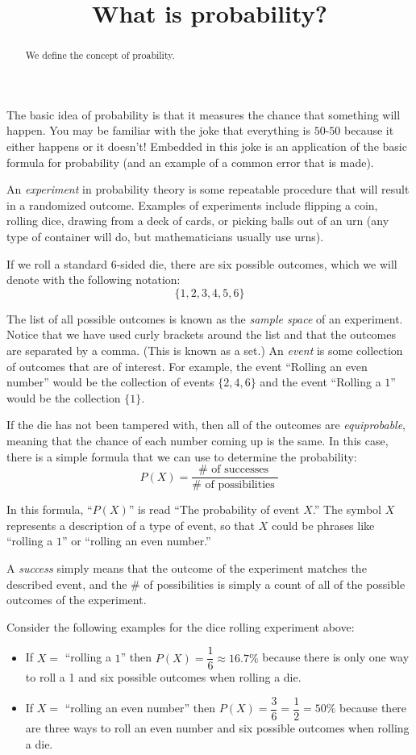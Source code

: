 \documentclass{ximera}
\title{What is probability?}
\begin{document}
\begin{abstract}
We define the concept of proability.
\end{abstract}
\maketitle

The basic idea of probability is that it measures the chance that something will happen. You may be familiar with the joke that everything is $50$-$50$ because it either happens or it doesn't! Embedded in this joke is an application of the basic formula for probability (and an example of a common error that is made).

An \emph{experiment} in probability theory is some repeatable procedure that will result in a randomized outcome. Examples of experiments include flipping a coin, rolling dice, drawing from a deck of cards, or picking balls out of an urn (any type of container will do, but mathematicians usually use urns).

If we roll a standard 6-sided die, there are six possible outcomes, which we will denote with the following notation:
\[ \{ 1, 2, 3, 4, 5, 6 \} \]

The list of all possible outcomes is known as the \emph{sample space} of an experiment. Notice that we have used curly brackets around the list and that the outcomes are separated by a comma. (This is known as a set.) An \emph{event} is some collection of outcomes that are of interest. For example, the event ``Rolling an even number'' would be the collection of events $\{ 2, 4, 6\}$ and the event ``Rolling a $1$'' would be the collection $\{ 1 \}$.

If the die has not been tampered with, then all of the outcomes are \emph{equiprobable}, meaning that the chance of each number coming up is the same. In this case, there is a simple formula that we can use to determine the probability:
\[ P(X) = \dfrac{ \text{$\#$ of successes }}{ \text{$\#$ of possibilities } } \]

In this formula, ``$P(X)$'' is read ``The probability of event $X$.'' The symbol $X$ represents a description of a type of event, so that $X$ could be phrases like ``rolling a $1$'' or ``rolling an even number.''

A \emph{success} simply means that the outcome of the experiment matches the described event, and the \# of possibilities is simply a count of all of the possible outcomes of the experiment.

Consider the following examples for the dice rolling experiment above:
\begin{itemize}
  \item If $X = $ ``rolling a $1$'' then $P(X) = \dfrac{1}{6} \approx 16.7\%$ because there is only one way to roll a 1 and six possible outcomes when rolling a die.
  \item If $X = $ ``rolling an even number'' then $P(X) = \dfrac{3}{6} = \dfrac{1}{2} = 50\%$ because there are three ways to roll an even number and six possible outcomes when rolling a die.
\end{itemize}
\end{document}
